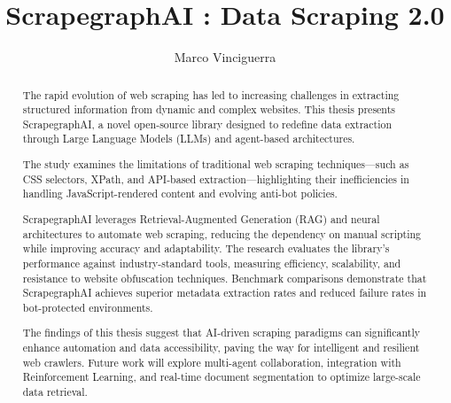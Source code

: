 \documentclass[english,master]{unibg}
\title{ScrapegraphAI : Data Scraping 2.0 }
\author{Marco Vinciguerra}
\begin{document}
\maketitle
\emptypage


\begin{abstract}
The rapid evolution of web scraping has led to increasing challenges in extracting structured information from dynamic and complex websites. This thesis presents ScrapegraphAI, a novel open-source library designed to redefine data extraction through Large Language Models (LLMs) and agent-based architectures. 

The study examines the limitations of traditional web scraping techniques—such as CSS selectors, XPath, and API-based extraction—highlighting their inefficiencies in handling JavaScript-rendered content and evolving anti-bot policies.

ScrapegraphAI  leverages Retrieval-Augmented Generation (RAG) and neural architectures to automate web scraping, reducing the dependency on manual scripting while improving accuracy and adaptability. The research evaluates the library's performance against industry-standard tools, measuring efficiency, scalability, and resistance to website obfuscation techniques. Benchmark comparisons demonstrate that ScrapegraphAI  achieves superior metadata extraction rates and reduced failure rates in bot-protected environments.

The findings of this thesis suggest that AI-driven scraping paradigms can significantly enhance automation and data accessibility, paving the way for intelligent and resilient web crawlers. Future work will explore multi-agent collaboration, integration with Reinforcement Learning, and real-time document segmentation to optimize large-scale data retrieval.
\end{abstract}

\emptypage
\toc
\emptypage

\clearpage
{}




\end{document}
